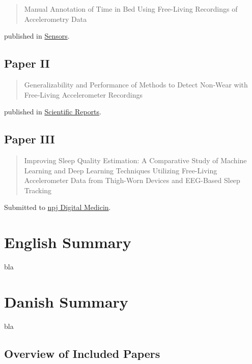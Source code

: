 \documentclass[
  8pt,
  letterpaper,
  DIV=11,
  numbers=noendperiod]{scrartcl}
\begin{document}
\begin{quote}
Manual Annotation of Time in Bed Using Free-Living Recordings of
Accelerometry Data\autocite{skovgaard_manual_2021}
\end{quote}

published in \href{https://doi.org/10.3390/s21248442}{Sensors}.

\hypertarget{paper-ii}{%
\subsection{Paper II}\label{paper-ii}}

\begin{quote}
Generalizability and Performance of Methods to Detect Non‑Wear with
Free‑Living Accelerometer
Recordings\autocite{skovgaard_generalizability_2023}
\end{quote}

published in \href{www.nature.com/scientificreports}{Scientific
Reports}.

\hypertarget{paper-iii}{%
\subsection{Paper III}\label{paper-iii}}

\begin{quote}
Improving Sleep Quality Estimation: A Comparative Study of Machine
Learning and Deep Learning Techniques Utilizing Free-Living
Accelerometer Data from Thigh-Worn Devices and EEG-Based Sleep Tracking
\end{quote}

Submitted to \href{https://www.nature.com/npjdigitalmed/}{npj Digital
Medicin}.

\hypertarget{english-summary}{%
\section{English Summary}\label{english-summary}}

bla

\hypertarget{danish-summary}{%
\section{Danish Summary}\label{danish-summary}}

bla

\hypertarget{overview-of-included-papers}{%
\subsection{Overview of Included
Papers}\label{overview-of-included-papers}}
\end{document}
